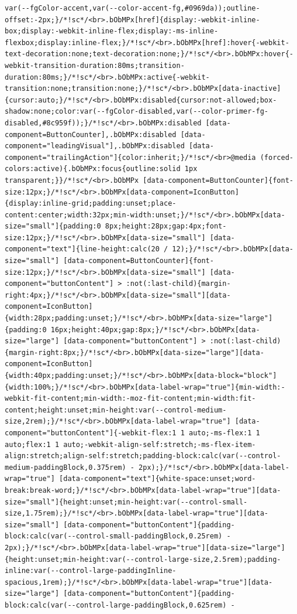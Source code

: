 \documentclass[
  letterpaper,
]{book}
\begin{document}
\begin{verbatim}
var(--fgColor-accent,var(--color-accent-fg,#0969da));outline-offset:-2px;}/*!sc*/<br>.bObMPx[href]{display:-webkit-inline-box;display:-webkit-inline-flex;display:-ms-inline-flexbox;display:inline-flex;}/*!sc*/<br>.bObMPx[href]:hover{-webkit-text-decoration:none;text-decoration:none;}/*!sc*/<br>.bObMPx:hover{-webkit-transition-duration:80ms;transition-duration:80ms;}/*!sc*/<br>.bObMPx:active{-webkit-transition:none;transition:none;}/*!sc*/<br>.bObMPx[data-inactive]{cursor:auto;}/*!sc*/<br>.bObMPx:disabled{cursor:not-allowed;box-shadow:none;color:var(--fgColor-disabled,var(--color-primer-fg-disabled,#8c959f));}/*!sc*/<br>.bObMPx:disabled [data-component=ButtonCounter],.bObMPx:disabled [data-component="leadingVisual"],.bObMPx:disabled [data-component="trailingAction"]{color:inherit;}/*!sc*/<br>@media (forced-colors:active){.bObMPx:focus{outline:solid 1px transparent;}}/*!sc*/<br>.bObMPx [data-component=ButtonCounter]{font-size:12px;}/*!sc*/<br>.bObMPx[data-component=IconButton]{display:inline-grid;padding:unset;place-content:center;width:32px;min-width:unset;}/*!sc*/<br>.bObMPx[data-size="small"]{padding:0 8px;height:28px;gap:4px;font-size:12px;}/*!sc*/<br>.bObMPx[data-size="small"] [data-component="text"]{line-height:calc(20 / 12);}/*!sc*/<br>.bObMPx[data-size="small"] [data-component=ButtonCounter]{font-size:12px;}/*!sc*/<br>.bObMPx[data-size="small"] [data-component="buttonContent"] > :not(:last-child){margin-right:4px;}/*!sc*/<br>.bObMPx[data-size="small"][data-component=IconButton]{width:28px;padding:unset;}/*!sc*/<br>.bObMPx[data-size="large"]{padding:0 16px;height:40px;gap:8px;}/*!sc*/<br>.bObMPx[data-size="large"] [data-component="buttonContent"] > :not(:last-child){margin-right:8px;}/*!sc*/<br>.bObMPx[data-size="large"][data-component=IconButton]{width:40px;padding:unset;}/*!sc*/<br>.bObMPx[data-block="block"]{width:100%;}/*!sc*/<br>.bObMPx[data-label-wrap="true"]{min-width:-webkit-fit-content;min-width:-moz-fit-content;min-width:fit-content;height:unset;min-height:var(--control-medium-size,2rem);}/*!sc*/<br>.bObMPx[data-label-wrap="true"] [data-component="buttonContent"]{-webkit-flex:1 1 auto;-ms-flex:1 1 auto;flex:1 1 auto;-webkit-align-self:stretch;-ms-flex-item-align:stretch;align-self:stretch;padding-block:calc(var(--control-medium-paddingBlock,0.375rem) - 2px);}/*!sc*/<br>.bObMPx[data-label-wrap="true"] [data-component="text"]{white-space:unset;word-break:break-word;}/*!sc*/<br>.bObMPx[data-label-wrap="true"][data-size="small"]{height:unset;min-height:var(--control-small-size,1.75rem);}/*!sc*/<br>.bObMPx[data-label-wrap="true"][data-size="small"] [data-component="buttonContent"]{padding-block:calc(var(--control-small-paddingBlock,0.25rem) - 2px);}/*!sc*/<br>.bObMPx[data-label-wrap="true"][data-size="large"]{height:unset;min-height:var(--control-large-size,2.5rem);padding-inline:var(--control-large-paddingInline-spacious,1rem);}/*!sc*/<br>.bObMPx[data-label-wrap="true"][data-size="large"] [data-component="buttonContent"]{padding-block:calc(var(--control-large-paddingBlock,0.625rem) - 
\end{verbatim}
\end{document}
